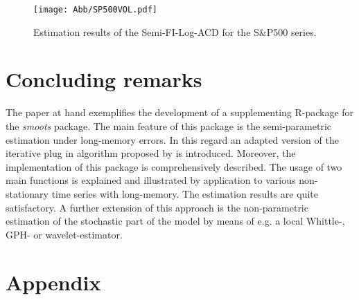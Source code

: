 \documentclass[12pt]{article}
\begin{document}
 
 \begin{figure}[h!]
 	\texttt{[image: Abb/SP500VOL.pdf]}
 	\caption{Estimation results of the Semi-FI-Log-ACD for the S\&P500 series.}
 \end{figure}


\section{Concluding remarks}
The paper at hand exemplifies the development of a supplementing R-package for the \textit{smoots} package. The main feature of this package is the semi-parametric estimation under long-memory errors. In this regard an adapted version of the iterative plug in algorithm proposed by \citet{beran2002iterative} is introduced. Moreover, the implementation of this package is comprehensively described. The usage of two main functions is explained and illustrated by application to various non-stationary time series with long-memory. The estimation results are quite satisfactory. A further extension of this approach is the non-parametric estimation of the stochastic part of the model by means of e.g.  a local Whittle-, GPH- or wavelet-estimator.
\clearpage

\printbibliography


\clearpage
\section*{Appendix}
\end{document}
